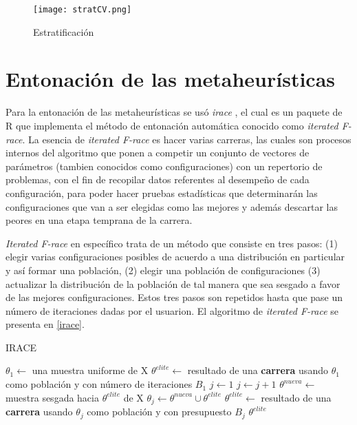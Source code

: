 \begin{figure}[]
\centering
\texttt{[image: stratCV.png]}
\caption[Estratificación]{Estratificación}
\label{strat}
\end{figure}

\section{Entonación de las metaheurísticas}

Para la entonación de las metaheurísticas se usó \emph{irace} \cite{lopez2016irace}, el cual es un paquete de R que implementa el método de entonación automática conocido como \emph{iterated F-race}. La esencia de \emph{iterated F-race}
es hacer varias carreras, las cuales son procesos internos del algoritmo que ponen a competir un conjunto de vectores de parámetros (tambien conocidos como configuraciones) con un repertorio de problemas, con el fin de recopilar datos referentes al desempeño de cada configuración, para poder hacer pruebas estadísticas que determinarán las configuraciones que van a ser elegidas como las mejores y además descartar las peores en una etapa temprana de la carrera. 

\emph{Iterated F-race} en específico trata de un método que consiste en tres pasos: (1) elegir varias configuraciones posibles de acuerdo a una distribución en particular y así formar una población, (2) elegir una población de configuraciones (3) actualizar la distribución de la población de tal manera que sea sesgado a favor de las mejores configuraciones. Estos tres pasos son repetidos hasta que pase un número de iteraciones dadas por el usuarion. El algoritmo de \emph{iterated F-race} se presenta en \ref{irace}.

\begin{algorithm}
\caption{IRACE}
\label{irace}
\begin{algorithmic}[1]


\State $\theta_1 \gets$ una muestra uniforme de X
\State $\theta^{elite} \gets$ resultado de una \textbf{carrera} usando $\theta_1$ como población y con número de iteraciones $B_1$
\State $j \gets 1$
	\State $j \gets j + 1$
	\State $\theta^{nueva} \gets$ muestra sesgada hacia $\theta^{elite}$ de X 
	\State $\theta_j \gets \theta^{nueva} \cup \theta^{elite}$
	\State $\theta^{elite} \gets$ resultado de una \textbf{carrera} usando $\theta_j$ como población y con presupuesto $B_j$
\EndWhile
\State \Return $\theta^{elite}$

\end{algorithmic}
\end{algorithm}

